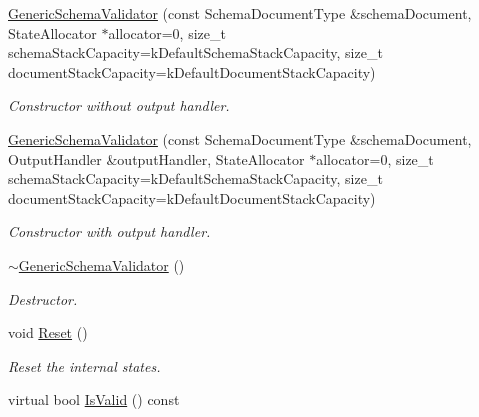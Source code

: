 \begin{DoxyCompactItemize}
\item 
\hyperlink{class_generic_schema_validator_a202ee6fdbe5ae9eab3e77a81ecdfeb6d}{Generic\+Schema\+Validator} (const Schema\+Document\+Type \&schema\+Document, State\+Allocator $\ast$allocator=0, size\+\_\+t schema\+Stack\+Capacity=k\+Default\+Schema\+Stack\+Capacity, size\+\_\+t document\+Stack\+Capacity=k\+Default\+Document\+Stack\+Capacity)
\begin{DoxyCompactList}\small\item\em Constructor without output handler. \end{DoxyCompactList}\item 
\hyperlink{class_generic_schema_validator_ac2027be8ca55b01cd6f38b45f4e233b4}{Generic\+Schema\+Validator} (const Schema\+Document\+Type \&schema\+Document, Output\+Handler \&output\+Handler, State\+Allocator $\ast$allocator=0, size\+\_\+t schema\+Stack\+Capacity=k\+Default\+Schema\+Stack\+Capacity, size\+\_\+t document\+Stack\+Capacity=k\+Default\+Document\+Stack\+Capacity)
\begin{DoxyCompactList}\small\item\em Constructor with output handler. \end{DoxyCompactList}\item 
\hyperlink{class_generic_schema_validator_a3eab83d483a50efb0c0390adf3291963}{$\sim$\+Generic\+Schema\+Validator} ()\hypertarget{class_generic_schema_validator_a3eab83d483a50efb0c0390adf3291963}{}\label{class_generic_schema_validator_a3eab83d483a50efb0c0390adf3291963}

\begin{DoxyCompactList}\small\item\em Destructor. \end{DoxyCompactList}\item 
void \hyperlink{class_generic_schema_validator_a49efbbe098cb77728be3d48cafed17e4}{Reset} ()\hypertarget{class_generic_schema_validator_a49efbbe098cb77728be3d48cafed17e4}{}\label{class_generic_schema_validator_a49efbbe098cb77728be3d48cafed17e4}

\begin{DoxyCompactList}\small\item\em Reset the internal states. \end{DoxyCompactList}\item 
virtual bool \hyperlink{class_generic_schema_validator_ae1559e9448b51a2de30cd39d431179f4}{Is\+Valid} () const \hypertarget{class_generic_schema_validator_ae1559e9448b51a2de30cd39d431179f4}{}\label{class_generic_schema_validator_ae1559e9448b51a2de30cd39d431179f4}


\end{DoxyCompactItemize}

